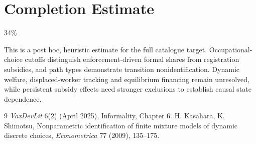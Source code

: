\documentclass[11pt]{article}
\theoremstyle{definition}
\begin{document}
\section{Completion Estimate}
34\%

This is a post hoc, heuristic estimate for the full catalogue target.
Occupational-choice cutoffs distinguish enforcement-driven formal shares from registration subsidies, and path types demonstrate transition nonidentification. Dynamic welfare, displaced-worker tracking and equilibrium financing remain unresolved, while persistent subsidy effects need stronger exclusions to establish causal state dependence.

\begin{thebibliography}{9}
 \emph{VoxDevLit} 6(2) (April 2025), Informality, Chapter 6.
 H. Kasahara, K. Shimotsu, Nonparametric identification of finite mixture models of dynamic discrete choices, \emph{Econometrica} 77 (2009), 135--175.
\end{thebibliography}
\end{document}
